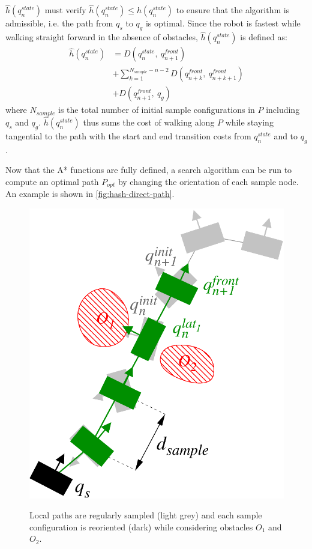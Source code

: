 $\hat{h}(q_n^{state})$ must verify $\hat{h}(q_n^{state}) \leq
h(q_n^{state})$ to ensure that the algorithm is admissible, i.e. the
path from $q_s$ to $q_g$ is optimal. Since the robot is fastest while
walking straight forward in the absence of obstacles,
$\hat{h}(q_n^{state})$ is defined as:
\begin{equation}
  \begin{split}
  \hat{h}(q_n^{state}) &= D(q_n^{state},~q_{n+1}^{front}) \\
  &+ \sum_{k=1}^{N_{sample}-n-2} D(q_{n+k}^{front},~q_{n+k+1}^{front}) \\
  &+ D(q_{n+1}^{front},~q_g)
  \end{split}
\end{equation}
where $N_{sample}$ is the total number of initial sample
configurations in $P$ including $q_s$ and
$q_g$. $\hat{h}(q_n^{state})$ thus sums the cost of walking along $P$
while staying tangential to the path with the start and
end transition costs from $q_n^{state}$ and to $q_g$.

Now that the A* functions are fully defined, a search algorithm can be
run to compute an optimal path $P_{opt}$ by changing the orientation
of each sample node. An example is shown in
\autoref{fig:hash-direct-path}.

\begin{figure}
  \centering
      {\includegraphics[width = 0.75\linewidth]
        {src/chap1-path-optimization/hash-direct-path.pdf}}
      \caption{Local paths are regularly sampled (light grey) and each
        sample configuration is reoriented (dark) while considering
        obstacles $O_1$ and $O_2$.}
      \label{fig:hash-direct-path}
\end{figure}

